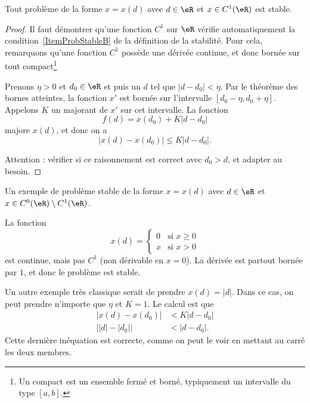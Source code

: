 \begin{lemma}   \label{LemITCxqyS}
	Tout  problème de la forme \( x=x(d)\) avec \( d\in\eR\) et \( x \in C^1(\eR)\) est stable.
\end{lemma}

\begin{proof}
	Il faut démontrer qu'une fonction \( C^1\) sur \( \eR\) vérifie automatiquement la condition~\ref{ItemProbStableB} de la définition de la stabilité. Pour cela, remarquons qu'une fonction \( C^1\) possède une dérivée continue, et donc bornée sur tout compact\footnote{Un compact est un ensemble fermé et borné, typiquement un intervalle du type \( [a,b]\).}

	Prenons \( \eta>0\) et \( d_0\in\eR\) et puis un \( d\) tel que \( | d-d_0 |<\eta\). Par le théorème des bornes atteintes, la fonction \( x'\) est bornée sur l'intervalle \( [d_0-\eta,d_0+\eta]\). Appelons \( K\) un majorant de \( x'\) sur cet intervalle. La fonction
	\begin{equation}
		f(d)=x(d_0)+K| d-d_0 |
	\end{equation}
	majore \( x(d)\), et donc on a
	\begin{equation}
		\big| x(d)-x(d_0) \big|\leq K| d-d_0 |.
	\end{equation}

	Attention : vérifier si ce raisonnement est correct avec \( d_0>d\), et adapter au besoin.
\end{proof}

\begin{example} \label{ExRZrOeoi}
	Un exemple de problème stable de la forme  \( x=x(d)\) avec \( d\in\eR\) et \( x \in C^0(\eR)\setminus C^1(\eR)\).

	La fonction
	\begin{equation}
		x(d)=\begin{cases}
			0 & \text{si }x\geq 0 \\
			x & \text{si }x>0
		\end{cases}
	\end{equation}
	est continue, mais pas \( C^1\) (non dérivable en \( x=0\)). La dérivée est partout bornée par \( 1\), et donc le problème est stable.

	Un autre exemple très classique serait de prendre \( x(d)=| d |\). Dans ce cas, on peut prendre n'importe que \( \eta\) et \( K=1\). Le calcul est que
	\begin{subequations}
		\begin{align}
			| x(d)-x(d_0) |           & <K| d-d_0 | \\
			\big| | d |-| d_0 | \big| & <| d-d_0 |.
		\end{align}
	\end{subequations}
	Cette dernière inéquation est correcte, comme on peut le voir en mettant au carré les deux membres.

\end{example}

